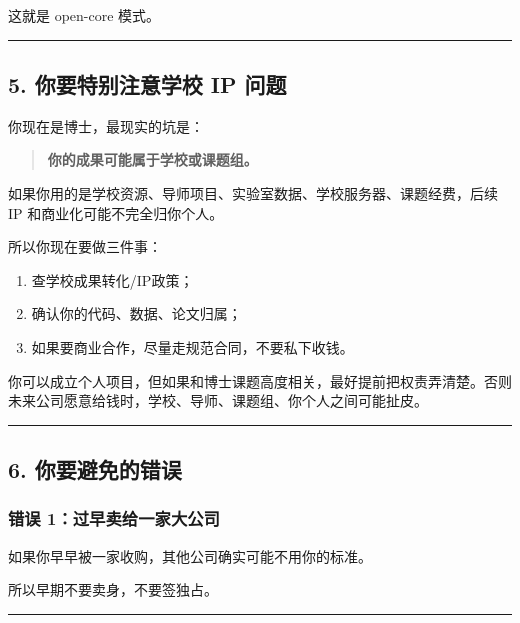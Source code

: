 \documentclass[
  12pt,
]{ctexart}
\providecommand{\tightlist}{%
  \setlength{\itemsep}{0pt}\setlength{\parskip}{0pt}}
\begin{document}
这就是 open-core 模式。

\begin{center}\rule{0.5\linewidth}{0.5pt}\end{center}

\subsection{5. 你要特别注意学校 IP
问题}\label{ux4f60ux8981ux7279ux522bux6ce8ux610fux5b66ux6821-ip-ux95eeux9898}

你现在是博士，最现实的坑是：

\begin{quote}
\textbf{你的成果可能属于学校或课题组。}
\end{quote}

如果你用的是学校资源、导师项目、实验室数据、学校服务器、课题经费，后续
IP 和商业化可能不完全归你个人。

所以你现在要做三件事：

\begin{enumerate}
\def\labelenumi{\arabic{enumi}.}
\tightlist
\item
  查学校成果转化/IP政策；
\item
  确认你的代码、数据、论文归属；
\item
  如果要商业合作，尽量走规范合同，不要私下收钱。
\end{enumerate}

你可以成立个人项目，但如果和博士课题高度相关，最好提前把权责弄清楚。否则未来公司愿意给钱时，学校、导师、课题组、你个人之间可能扯皮。

\begin{center}\rule{0.5\linewidth}{0.5pt}\end{center}

\subsection{6.
你要避免的错误}\label{ux4f60ux8981ux907fux514dux7684ux9519ux8bef}

\subsubsection{错误
1：过早卖给一家大公司}\label{ux9519ux8bef-1ux8fc7ux65e9ux5356ux7ed9ux4e00ux5bb6ux5927ux516cux53f8}

如果你早早被一家收购，其他公司确实可能不用你的标准。

所以早期不要卖身，不要签独占。

\begin{center}\rule{0.5\linewidth}{0.5pt}\end{center}
\end{document}
